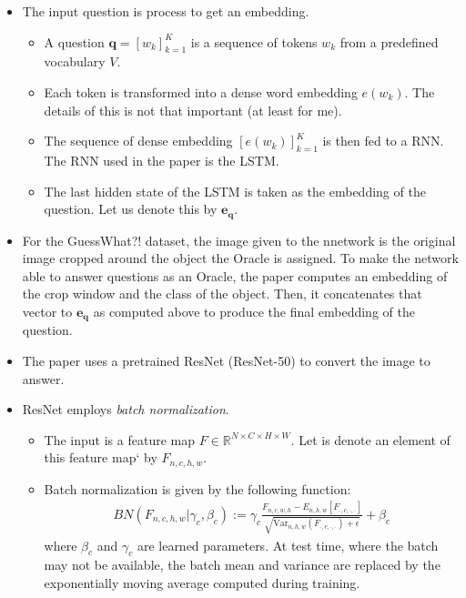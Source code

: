 \documentclass[10pt]{article}
\newcommand{\ve}[1]{\mathbf{#1}}
\newcommand{\Real}{\mathbb{R}}
\begin{document}
  \begin{itemize}
  	\item The input question is process to get an embedding.
  	\begin{itemize}
  		\item A question $\ve{q} = [w_k]_{k=1}^K$ is a sequence of tokens $w_k$ from a predefined vocabulary $V$.
  		
  		\item Each token is transformed into a dense word embedding $e(w_k)$. The details of this is not that important (at least for me).

  		\item The sequence of dense embedding $[e(w_k)]_{k=1}^K$ is then fed to a RNN. The RNN used in the paper is the LSTM.

  		\item The last hidden state of the LSTM is taken as the embedding of the question. Let us denote this by $\ve{e}_{\ve{q}}$.
  	\end{itemize}

  	\item For the GuessWhat?! dataset, the image given to the nnetwork is the original image cropped around the object the Oracle is assigned. To make the network able to answer questions as an Oracle, the paper computes an embedding of the crop window and the class of the object. Then, it concatenates that vector to $\ve{e}_{\ve{q}}$ as computed above to produce the final embedding of the question.

  	\item The paper uses a pretrained ResNet (ResNet-50) to convert the image to answer.

  	\item ResNet employs \emph{batch normalization}. 
  	\begin{itemize}
  		\item The input is a feature map $F \in \Real^{N \times C \times H \times W}$. Let is denote an element of this feature map` by $F_{n,c,h,w}$.
  		
  		\item Batch normalization is given by the following function:
  		\begin{align*}
  			BN(F_{n,c,h,w}|\gamma_c,\beta_c) 
  			:= \gamma_c \frac{F_{n,c,w,h} - E_{n,h,w}[F_{\cdot,c,\cdot,\cdot}]}{\sqrt{\mathrm{Var}_{n,h,w}(F_{\cdot,c,\cdot,\cdot}) + \epsilon}} + \beta_c
  		\end{align*}
  		where $\beta_c$ and $\gamma_c$ are learned parameters. At test time, where the batch may not be available, the batch mean and variance are replaced by the exponentially moving average computed during training.
  	\end{itemize}
  	


\end{itemize}
\end{document}
